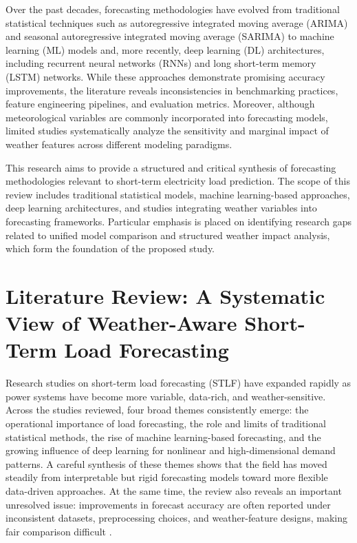 \documentclass[conference]{IEEEtran}
\begin{document}
Over the past decades, forecasting methodologies have evolved from traditional statistical techniques such as autoregressive integrated moving
average (ARIMA) and seasonal autoregressive integrated moving average (SARIMA) to machine learning (ML) models and, more recently, deep learning (DL) architectures, including recurrent neural networks (RNNs) and long short-term memory (LSTM) networks. While these approaches demonstrate promising accuracy improvements, the literature reveals inconsistencies in benchmarking practices, feature engineering pipelines, and evaluation metrics. Moreover, although meteorological variables are commonly incorporated into forecasting models, limited studies systematically analyze the sensitivity and marginal impact of weather features across different modeling paradigms.

This research aims to provide a structured and critical synthesis of forecasting methodologies relevant to short-term electricity load prediction. The scope of this review includes traditional statistical models, machine learning-based approaches, deep learning architectures, and studies integrating weather variables into forecasting frameworks. Particular emphasis is placed on identifying research gaps related to unified model comparison and structured weather impact analysis, which form the foundation of the proposed study.

\section{Literature Review: A Systematic View of Weather-Aware Short-Term Load Forecasting}
Research studies on short-term load forecasting (STLF) have expanded rapidly as power systems have become more variable, data-rich, and weather-sensitive. Across the studies reviewed, four broad themes consistently emerge: the operational importance of load forecasting, the role and limits of traditional statistical methods, the rise of machine learning-based forecasting, and the growing influence of deep learning for nonlinear and high-dimensional demand patterns. A careful synthesis of these themes shows that the field has moved steadily from interpretable but rigid forecasting models toward more flexible data-driven approaches. At the same time, the review also reveals an important unresolved issue: improvements in forecast accuracy are often reported under inconsistent datasets, preprocessing choices, and weather-feature designs, making fair comparison difficult \cite{10630814,10320357,vivas2020,Eren}.
\end{document}
